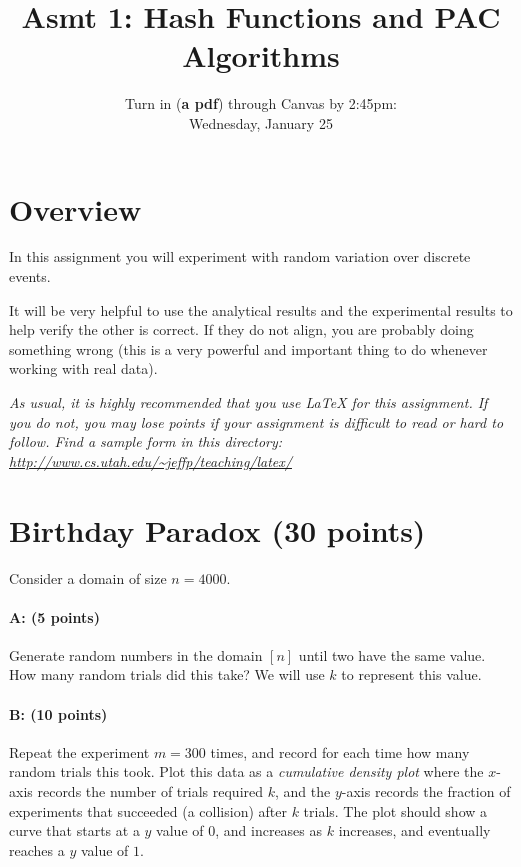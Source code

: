 \documentclass[11pt]{article}
\title{Asmt 1: Hash Functions and PAC Algorithms}
\author{Turn in (\textbf{a pdf}) through Canvas by 2:45pm: \\
Wednesday, January 25}
\date{}
\begin{document}
\maketitle






\section*{Overview}

In this assignment you will experiment with random variation over discrete events.  


It will be very helpful to use the analytical results and the experimental results to help verify the other is correct.  If they do not align, you are probably doing something wrong (this is a very powerful and important thing to do whenever working with real data).  


\vspace{.1in}

\emph{As usual, it is highly recommended that you use LaTeX for this assignment.  If you do not, you may lose points if your assignment is difficult to read or hard to follow.  Find a sample form in this directory:
\url{http://www.cs.utah.edu/~jeffp/teaching/latex/}}

\section{Birthday Paradox (30 points)}

Consider a domain of size $n = 4000$.  

\paragraph{A: (5 points)}
Generate random numbers in the domain $[n]$ until two have the same value.  How many random trials did this take?  
We will use $k$ to represent this value.  

\paragraph{B: (10 points)}  
Repeat the experiment $m = 300$ times, and record for each time how many random trials this took.  Plot this data as a \emph{cumulative density plot} where the $x$-axis records the number of trials required $k$, and the $y$-axis records the fraction of experiments that succeeded (a collision) after $k$ trials.  The plot should show a curve that starts at a $y$ value of $0$, and increases as $k$ increases, and eventually reaches a $y$ value of $1$.  
\end{document}
